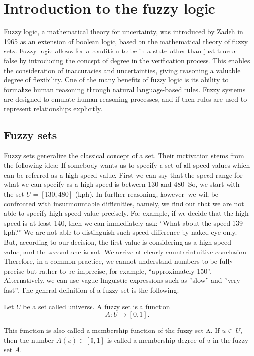 \section{Introduction to the fuzzy logic}


Fuzzy logic, a mathematical theory for uncertainty, was introduced by Zadeh in 1965 as an extension of boolean logic, based on the mathematical theory of fuzzy sets. Fuzzy logic allows for a condition to be in a state other than just true or false by introducing the concept of degree in the verification process. This enables the consideration of inaccuracies and uncertainties, giving reasoning a valuable degree of flexibility. One of the many benefits of fuzzy logic is its ability to formalize human reasoning through natural language-based rules. Fuzzy systems are designed to emulate human reasoning processes, and if-then rules are used to represent relationships explicitly.

\subsection{Fuzzy sets}

Fuzzy sets generalize the classical concept of a set. Their motivation stems from the following idea: If somebody wants us to specify a set of all speed values which can be referred as a high speed value. First we can say that the speed range for what we can specify as a high speed is between 130 and 480. So, we start with the set \(U = [130, 480]\) (kph). In further reasoning, however, we will be confronted with insurmountable difficulties,
namely, we find out that we are not able to specify high speed value precisely. For example,
if we decide that the high speed is at least 140, then we can
immediately ask: “What about the speed 139 kph?” We are not able to distinguish
such speed difference by naked eye only. But, according to our decision,
the first value is considering as a high speed value, and the second one is not. We arrive at clearly counterintuitive
conclusion. Therefore, in a common practice, we cannot understand numbers to
be fully precise but rather to be imprecise, for example, “approximately 150”. Alternatively,
we can use vague linguistic expressions such as “slow” and “very fast”. \cite{NOPEDV16}
The general definition of a fuzzy set is the following.

Let \(U\) be a set called universe. A fuzzy set is a function
\[A : U \rightarrow [0, 1].\]

This function is also called a membership function of the fuzzy set A. If \(u \in \ U\), then the number \(A(u) \in [0, 1]\) is called a membership degree of \(u\) in the fuzzy set \(A\).

